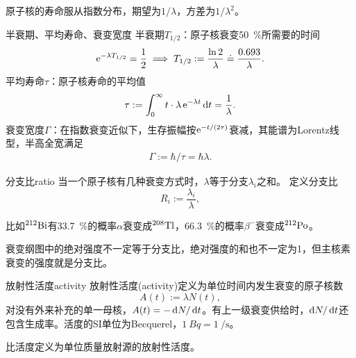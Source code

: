 \begin{corollary}
	原子核的寿命服从指数分布，期望为$1/\lambda$，方差为$1/\lambda^2$。
\end{corollary}


\begin{definition}{半衰期、平均寿命、衰变宽度}{}
	半衰期$T_{1/2}$：原子核衰变\qty{50}{\percent}所需要的时间
	\begin{equation}
		\mathop{}\!\mathrm{e}^{-\lambda T_{1/2}} = \frac12 \implies T_{1/2} := \frac{\ln 2}\lambda \doteq \frac{0.693}\lambda.
	\end{equation}
	平均寿命$\tau$：原子核寿命的平均值
	\begin{align}
		\tau := \int_0^\infty t \cdot \lambda\mathop{}\!\mathrm{e}^{-\lambda t}\mathop{}\!\mathrm{d} t = \frac1\lambda.
	\end{align}
	衰变宽度$\Gamma$：在指数衰变近似下，生存振幅按$\mathop{}\!\mathrm{e}^{-t/(2\tau)}$衰减，其能谱为Lorentz线型，半高全宽满足
	\begin{align}
		\Gamma := \hbar/\tau = \hbar\lambda.
	\end{align}
\end{definition}

\begin{definition}{分支比}{ratio}
	当一个原子核有几种衰变方式时，$\lambda$等于分支$\lambda_i$之和。
	定义分支比
	\begin{equation}
		R_i := \frac{\lambda_i}\lambda,
	\end{equation}
\end{definition}

比如$\nuclide{212}{Bi}$有\qty{33.7}{\percent}的概率$\alpha$衰变成$\nuclide{208}{Tl}$，\qty{66.3}{\percent}的概率$\beta^-$衰变成$\nuclide{212}{Po}$。

\begin{remark}
	衰变纲图中的绝对强度不一定等于分支比，绝对强度的和也不一定为1，但主核素衰变的强度就是分支比。
\end{remark}

\begin{definition}{放射性活度}{activity}
	放射性活度(activity)定义为单位时间内发生衰变的原子核数
	\begin{equation}
		A(t) := \lambda N(t),
	\end{equation}
	对没有外来补充的单一母核，$A(t) = -\mathop{}\!\mathrm{d} N/\mathop{}\!\mathrm{d} t$。有上一级衰变供给时，$\mathop{}\!\mathrm{d} N/\mathop{}\!\mathrm{d} t$还包含生成率。活度的SI单位为Becquerel，$\qty{1}{Bq} = \qty{1}{\per\second}$。
	
	比活度定义为单位质量放射源的放射性活度。
\end{definition}

